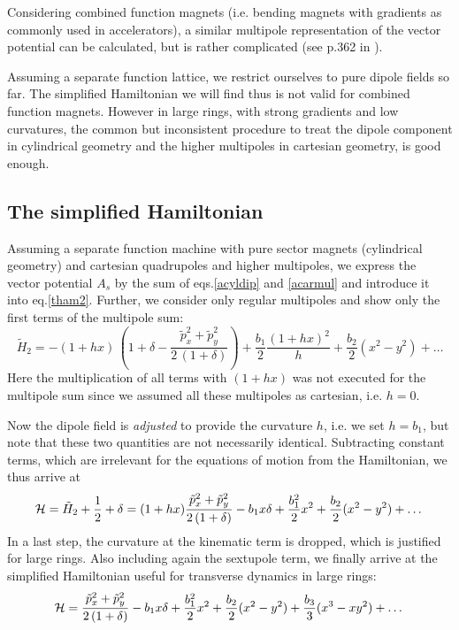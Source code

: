 \documentclass[12pt]{article}
\newcommand\beq{\begin{equation}}
\newcommand\eeq{\end{equation}}
\begin{document}
Considering combined function magnets (i.e. bending magnets with gradients
as commonly used in accelerators), a similar multipole representation of
the vector potential can be calculated, but is rather complicated (see p.362 in \cite{ef}).

Assuming a separate function lattice, we restrict ourselves to pure dipole fields so far.
The simplified Hamiltonian we will find thus is not valid for combined function
magnets. However in large rings, with strong gradients and
low curvatures, the common but inconsistent procedure to treat the
dipole component in cylindrical geometry and the
higher multipoles in cartesian geometry, is good enough.

\subsection{The simplified Hamiltonian}
Assuming a separate function machine with pure sector magnets (cylindrical geometry) and
cartesian quadrupoles and higher multipoles, we express the vector potential $A_s$
by the sum of eqs.\ref{acyldip} and \ref{acarmul} and introduce it into eq.\ref{tham2}.
Further, we consider only regular multipoles and show only the first terms of the multipole sum:
\beq
\tilde{H}_2 =-(1+hx)\, \left( 1+\delta - \frac{\tilde{p}_x^2+\tilde{p}_y^2}{2\,(1+\delta)}\right)
+ \frac{b_1}{2} \frac{(1+hx)^2}{h} + \frac{b_2}{2}(x^2-y^2) + \dots
\eeq
Here the multiplication of all terms with $(1+hx)$ was not executed for the multipole sum since
we assumed all these multipoles as cartesian, i.e. $h=0$.

Now the dipole field is {\em adjusted} to provide the curvature $h$, i.e. we set $h=b_1$, but note
that these two quantities are not necessarily identical. Subtracting constant terms, which are
irrelevant for the equations of motion from the Hamiltonian, we thus arrive at
\beq
{\cal H} = \tilde{H}_2+\frac{1}{2}+\delta =
(1+hx)\frac{\tilde{p}_x^2+\tilde{p}_y^2}{2\,(1+\delta)} - b_1 x \delta + \frac{b_1^2}{2}x^2 +
\frac{b_2}{2}(x^2-y^2) + \dots
\eeq
In a last step, the curvature at the kinematic term is dropped, which is justified for large rings.
Also including again the sextupole term, we finally arrive at the simplified Hamiltonian
useful for transverse dynamics in large rings:
\beq
{\cal H} = \frac{\tilde{p}_x^2+\tilde{p}_y^2}{2\,(1+\delta)} - b_1 x \delta + \frac{b_1^2}{2}x^2 +
\frac{b_2}{2}(x^2-y^2) + \frac{b_3}{3}(x^3-xy^2) + \dots
\eeq
\end{document}
